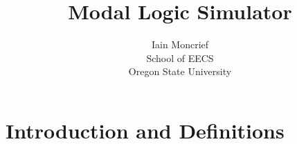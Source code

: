 \documentclass[11pt]{article}
\begin{document}
\title{\textbf{Modal Logic Simulator}}

\author{Iain Moncrief \\
School of EECS \\
Oregon State University
}

\maketitle

\section{Introduction and Definitions}
\label{sec:intro}

\end{document}
